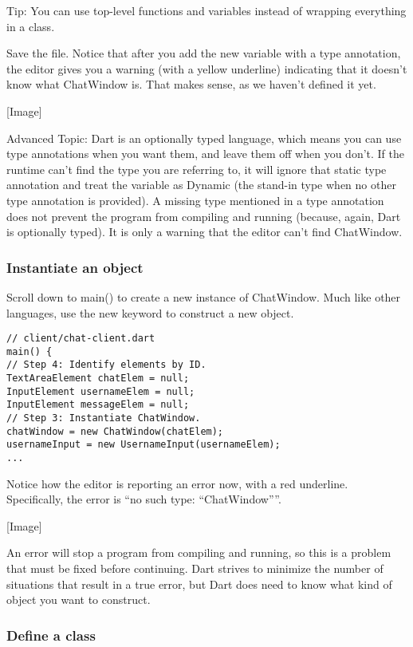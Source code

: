 Tip: You can use top-level functions and variables instead of wrapping everything in a class.

Save the file. Notice that after you add the new variable with a type annotation, the editor gives you a warning (with a yellow underline) indicating that it doesn’t know what ChatWindow is. That makes sense, as we haven’t defined it yet.

[Image]

Advanced Topic: Dart is an optionally typed language, which means you can use type annotations when you want them, and leave them off when you don’t. If the runtime can’t find the type you are referring to, it will ignore that static type annotation and treat the variable as Dynamic (the stand-in type when no other type annotation is provided). A missing type mentioned in a type annotation does not prevent the program from compiling and running (because, again, Dart is optionally typed). It is only a warning that the editor can’t find ChatWindow.

\subsubsection{Instantiate an object}

Scroll down to main() to create a new instance of ChatWindow. Much like other languages, use the new keyword to construct a new object.

\begin{verbatim}
// client/chat-client.dart
main() {
// Step 4: Identify elements by ID.
TextAreaElement chatElem = null;
InputElement usernameElem = null;
InputElement messageElem = null;
// Step 3: Instantiate ChatWindow.
chatWindow = new ChatWindow(chatElem);
usernameInput = new UsernameInput(usernameElem);
...
\end{verbatim}

Notice how the editor is reporting an error now, with a red underline. Specifically, the error is ``no such type: ``ChatWindow''''.

[Image]

An error will stop a program from compiling and running, so this is a problem that must be fixed before continuing. Dart strives to minimize the number of situations that result in a true error, but Dart does need to know what kind of object you want to construct.

\subsubsection{Define a class}

